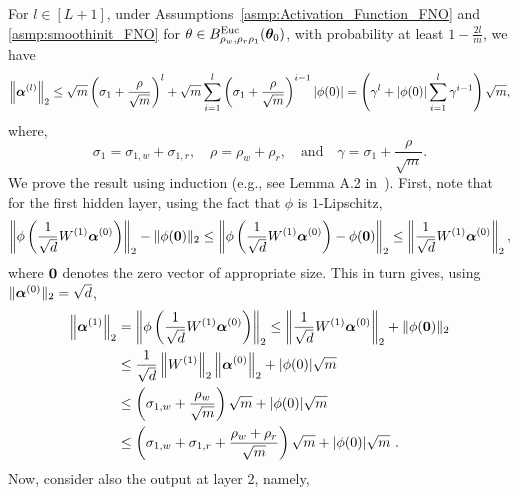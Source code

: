 \begin{lemm}
\label{lemm:TwoNormOutputFNOBlock}
For $l\in [L+1]$, under Assumptions~\ref{asmp:Activation_Function_FNO} and \ref{asmp:smoothinit_FNO} for $\theta\in B^{\mathrm{Euc}}_{\rho_w,\rho_r\rho_1}({\bm{\theta}}_0)$, with probability at least $1 - \frac{2l}{m}$, we have
\begin{equation}
    \left\|\boldsymbol{\alpha}^{(l)}\right\|_2 \leq \sqrt{m}\left(\sigma_1+\frac{\rho}{\sqrt{m}}\right)^l+\sqrt{m} \sum_{i=1}^l\left(\sigma_1+\frac{\rho}{\sqrt{m}}\right)^{i-1}|\phi(0)|=\left(\gamma^l+|\phi(0)| \sum_{i=1}^l \gamma^{i-1}\right) \sqrt{m},
\end{equation}
where,
\begin{equation*}
    \sigma_1 = \sigma_{1,w} + \sigma_{1,r},\quad\rho = \rho_w + \rho_r,\quad \text{and}\quad \gamma=\sigma_1+\frac{\rho}{\sqrt{m}}.
\end{equation*}
\proof We prove the result using induction (e.g., see Lemma A.2 in~\citep{banerjee2022restricted}). First, note that for the first hidden layer, using the fact that $\phi$ is $1$-Lipschitz,
\begin{equation}
    \left\|\phi\left(\frac{1}{\sqrt{d}} W^{(1)} \boldsymbol{\alpha}^{(0)}\right)\right\|_2-\|\phi(\mathbf{0})\|_2 \leq\left\|\phi\left(\frac{1}{\sqrt{d}} W^{(1)} \boldsymbol{\alpha}^{(0)}\right)-\phi(\mathbf{0})\right\|_2 \leq\left\|\frac{1}{\sqrt{d}} W^{(1)} \boldsymbol{\alpha}^{(0)}\right\|_2,
\end{equation}
where ${\bm{0}}$ denotes the zero vector of appropriate size. This in turn gives, using $\|\boldsymbol{\alpha}^{(0)} \|_2 = \sqrt{d}$,
\begin{align*}
    \begin{aligned}
        \left\|\boldsymbol{\alpha}^{(1)}\right\|_2 & =\left\|\phi\left(\frac{1}{\sqrt{d}} W^{(1)} \boldsymbol{\alpha}^{(0)}\right)\right\|_2 \leq\left\|\frac{1}{\sqrt{d}} W^{(1)} \boldsymbol{\alpha}^{(0)}\right\|_2+\|\phi(\mathbf{0})\|_2 \\
        & \leq \frac{1}{\sqrt{d}}\left\|W^{(1)}\right\|_2\left\|\boldsymbol{\alpha}^{(0)}\right\|_2+|\phi(0)| \sqrt{m} \\
        & \leq\left(\sigma_{1,w}+\frac{\rho_w}{\sqrt{m}}\right) \sqrt{m}+|\phi(0)| \sqrt{m} \\
        & \leq\left(\sigma_{1,w}+\sigma_{1,r}+\frac{\rho_w + \rho_r}{\sqrt{m}}\right) \sqrt{m}+|\phi(0)| \sqrt{m}~.
    \end{aligned}
\end{align*}
Now, consider also the output at layer $2$, namely,
\begin{align*}

\end{align*}
\end{lemm}
